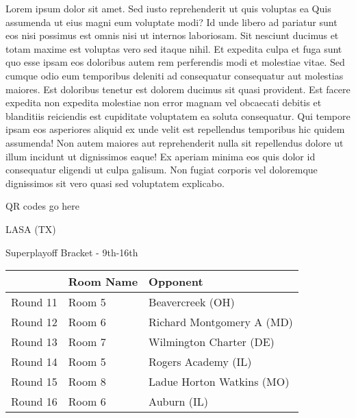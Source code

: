\documentclass{article}%
\begin{document}
\vspace*{8pt}%
\linebreak%
\newline%
\newline%
    Lorem ipsum dolor sit amet. Sed iusto reprehenderit ut quis voluptas ea Quis assumenda ut eius magni eum voluptate modi? Id unde libero ad pariatur sunt eos nisi possimus est omnis nisi ut internos laboriosam. Sit nesciunt ducimus et totam maxime est voluptas vero sed itaque nihil. Et expedita culpa et fuga sunt quo esse ipsam eos doloribus autem rem perferendis modi et molestiae vitae.\newline%
\newline%
    Sed cumque odio eum temporibus deleniti ad consequatur consequatur aut molestias maiores. Est doloribus tenetur est dolorem ducimus sit quasi provident. Est facere expedita non expedita molestiae non error magnam vel obcaecati debitis et blanditiis reiciendis est cupiditate voluptatem ea soluta consequatur. Qui tempore ipsam eos asperiores aliquid ex unde velit est repellendus temporibus hic quidem assumenda!\newline%
\newline%
    Non autem maiores aut reprehenderit nulla sit repellendus dolore ut illum incidunt ut dignissimos eaque! Ex aperiam minima eos quis dolor id consequatur eligendi ut culpa galisum. Non fugiat corporis vel doloremque dignissimos sit vero quasi sed voluptatem explicabo.\newline%
\newline%
\vspace*{30pt}%
\begin{center}%
\begin{Huge}%
QR codes go here%
\end{Huge}%
\end{center}%
\newpage%
\begin{center}%
\begin{Huge}%
LASA (TX)%
\end{Huge}%
\vspace*{8pt}%
\linebreak%
\begin{Large}%
Superplayoff Bracket {-} 9th{-}16th%
\end{Large}%
\end{center}%
%
\begin{tabularx}{\textwidth}{|c|Y|Y|}%
\hline%
&Room Name&Opponent\\%
\hline%
Round 11&Room 5&Beavercreek (OH)\\%
Round 12&Room 6&Richard Montgomery A (MD)\\%
Round 13&Room 7&Wilmington Charter (DE)\\%
Round 14&Room 5&Rogers Academy (IL)\\%
Round 15&Room 8&Ladue Horton Watkins (MO)\\%
Round 16&Room 6&Auburn (IL)\\%
\hline%
\end{tabularx}%
\end{document}
